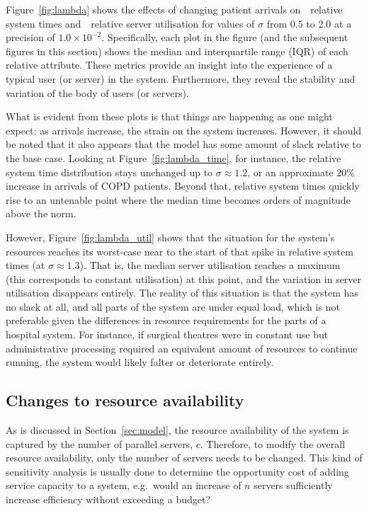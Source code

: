\documentclass[]{interact}
\theoremstyle{plain}%
\theoremstyle{definition}
\theoremstyle{remark}
\begin{document}
Figure~\ref{fig:lambda} shows the effects of changing patient arrivals
on~~relative system times
and~~relative server utilisation for values of
\(\sigma\) from 0.5 to 2.0 at a precision of \(1.0 \times 10^{-2}\).
Specifically, each plot in the figure (and the subsequent figures in this
section) shows the median and interquartile range (IQR) of each relative
attribute. These metrics provide an insight into the experience of a typical
user (or server) in the system. Furthermore, they reveal the stability and
variation of the body of users (or servers).

What is evident from these plots is that things are happening as one might
expect: as arrivals increase, the strain on the system increases. However, it
should be noted that it also appears that the model has some amount of slack
relative to the base case. Looking at Figure~\ref{fig:lambda_time}, for
instance, the relative system time distribution stays unchanged up to \(\sigma
\approx 1.2\), or an approximate 20\% increase in arrivals of COPD patients.
Beyond that, relative system times quickly rise to an untenable point where the
median time becomes orders of magnitude above the norm.

However, Figure~\ref{fig:lambda_util} shows that the situation for the system's
resources reaches its worst-case near to the start of that spike in relative
system times (at \(\sigma \approx 1.3\)). That is, the median server utilisation
reaches a maximum (this corresponds to constant utilisation) at this point, and
the variation in server utilisation disappears entirely. The reality of this
situation is that the system has no slack at all, and all parts of the system
are under equal load, which is not preferable given the differences in resource
requirements for the parts of a hospital system. For instance, if surgical
theatres were in constant use but administrative processing required an
equivalent amount of resources to continue running, the system would likely
falter or deteriorate entirely.


\subsection{Changes to resource availability}\label{subsec:resources}

As is discussed in Section~\ref{sec:model}, the resource availability of the
system is captured by the number of parallel servers, \(c\). Therefore, to
modify the overall resource availability, only the number of servers needs to be
changed. This kind of sensitivity analysis is usually done to determine the
opportunity cost of adding service capacity to a system, e.g.\ would an increase
of \(n\) servers sufficiently increase efficiency without exceeding a budget?
\end{document}
